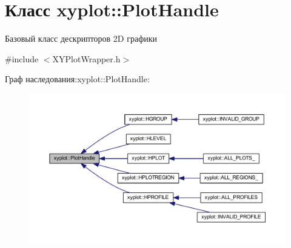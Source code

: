\hypertarget{classxyplot_1_1_plot_handle}{\section{Класс xyplot\-:\-:Plot\-Handle}
\label{classxyplot_1_1_plot_handle}
}


Базовый класс дескрипторов 2\-D графики  




{\ttfamily \#include $<$X\-Y\-Plot\-Wrapper.\-h$>$}



Граф наследования\-:xyplot\-:\-:Plot\-Handle\-:\nopagebreak
\begin{figure}[H]
\begin{center}
\leavevmode
\includegraphics[width=350pt]{classxyplot_1_1_plot_handle__inherit__graph}
\end{center}
\end{figure}
